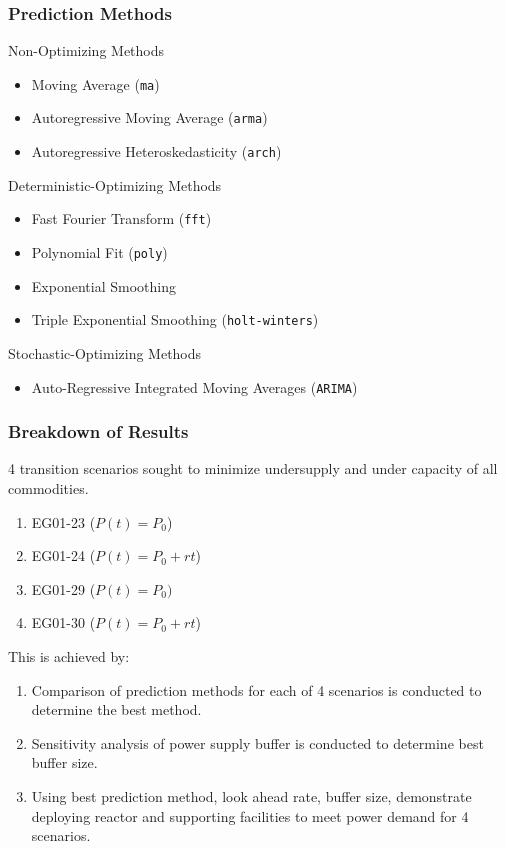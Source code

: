 \begin{frame}
\frametitle{\deploy Prediction Methods}
Non-Optimizing Methods 
\begin{itemize}
\item Moving Average (\texttt{ma})
\item Autoregressive Moving Average (\texttt{arma})
\item Autoregressive Heteroskedasticity (\texttt{arch})
\end{itemize}
Deterministic-Optimizing Methods 
\begin{itemize}
\item Fast Fourier Transform (\texttt{fft})
\item Polynomial Fit (\texttt{poly})
\item Exponential Smoothing
\item Triple Exponential Smoothing (\texttt{holt-winters})
\end{itemize}
Stochastic-Optimizing Methods 
\begin{itemize}
\item Auto-Regressive Integrated Moving Averages (\texttt{ARIMA})
\end{itemize}
\end{frame}

\begin{frame}
\frametitle{Breakdown of Results}
4 transition scenarios sought to minimize undersupply and under capacity of 
all commodities.
\begin{enumerate}
	\item EG01-23 ($P(t) = P_0$)
	\item EG01-24 ($P(t) = P_0 + rt$)
	\item EG01-29 ($P(t) = P_0)$
	\item EG01-30 ($P(t) = P_0 + rt$)
\end{enumerate}

This is achieved by:
\begin{enumerate}
	\item Comparison of prediction methods for each of 4 scenarios is conducted 
	to determine the best method. 
	\item Sensitivity analysis of power supply buffer is conducted to determine 
	best buffer size. 
	\item Using best prediction method, look ahead rate, buffer size, demonstrate \deploy 
	deploying reactor and supporting facilities to meet power demand 
	for 4 scenarios. 
\end{enumerate}

\end{frame}


